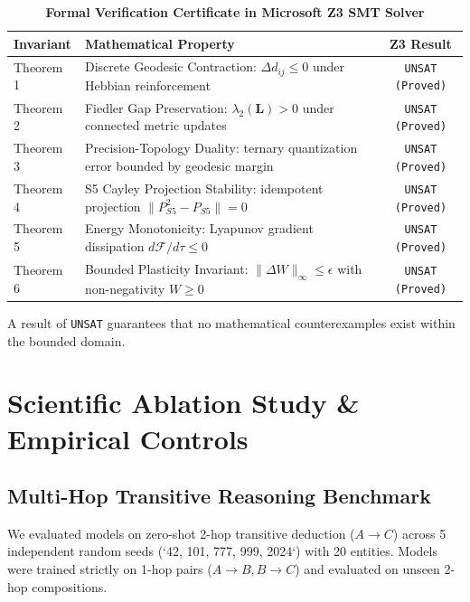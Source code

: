 \documentclass[11pt,a4paper]{article}
\begin{document}
\begin{table}[htbp]
\centering
\small
\caption{\textbf{Formal Verification Certificate in Microsoft Z3 SMT Solver}}
\label{tab:z3}
\begin{tabularx}{\textwidth}{l X c}
\toprule
\textbf{Invariant} & \textbf{Mathematical Property} & \textbf{Z3 Result} \\
\midrule
Theorem 1 & Discrete Geodesic Contraction: $\Delta d_{ij} \le 0$ under Hebbian reinforcement & \texttt{UNSAT (Proved)} \\
Theorem 2 & Fiedler Gap Preservation: $\lambda_2(\mathbf{L}) > 0$ under connected metric updates & \texttt{UNSAT (Proved)} \\
Theorem 3 & Precision-Topology Duality: ternary quantization error bounded by geodesic margin & \texttt{UNSAT (Proved)} \\
Theorem 4 & S5 Cayley Projection Stability: idempotent projection $\|P_{S5}^2 - P_{S5}\| = 0$ & \texttt{UNSAT (Proved)} \\
Theorem 5 & Energy Monotonicity: Lyapunov gradient dissipation $d\mathcal{F}/d\tau \le 0$ & \texttt{UNSAT (Proved)} \\
Theorem 6 & Bounded Plasticity Invariant: $\|\Delta W\|_\infty \le \epsilon$ with non-negativity $W \ge 0$ & \texttt{UNSAT (Proved)} \\
\bottomrule
\end{tabularx}
\end{table}

A result of \texttt{UNSAT} guarantees that no mathematical counterexamples exist within the bounded domain.

\section{Scientific Ablation Study \& Empirical Controls}

\subsection{Multi-Hop Transitive Reasoning Benchmark}
We evaluated models on zero-shot 2-hop transitive deduction ($A \to C$) across 5 independent random seeds (`42, 101, 777, 999, 2024`) with 20 entities. Models were trained strictly on 1-hop pairs ($A \to B, B \to C$) and evaluated on unseen 2-hop compositions.
\end{document}
